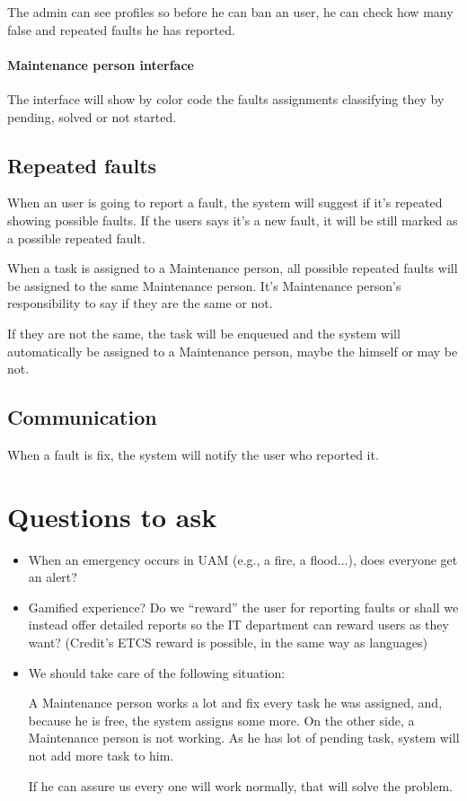 The admin can see profiles so before he can ban an user, he can check how many false and repeated faults he has reported.


\paragraph{Maintenance person interface}
The interface will show by color code the faults assignments classifying  they by pending, solved or not started.


\subsection{Repeated faults}
When an user is going to report a fault, the system will suggest if it's repeated showing possible faults. If the users says it's a new fault, it will be still marked as a possible repeated fault.

When a task is assigned to a Maintenance person, all possible repeated faults will be assigned to the same Maintenance person. It's Maintenance person's responsibility to say if they are the same or not.

If they are not the same, the task will be enqueued and the system will automatically be assigned to a Maintenance person, maybe the himself or may be not.


\subsection{Communication}

When a fault is fix, the system will notify the user who reported it.

\section{Questions to ask}

\begin{itemize}
\item When an emergency occurs in UAM (e.g., a fire, a flood...), does everyone get an alert?
\item Gamified experience? Do we ``reward'' the user for reporting faults or shall we instead offer detailed reports so the IT department can reward users as they want? (Credit's ETCS reward is possible, in the same way as languages)
\item We should take care of the following situation:

A Maintenance person works a lot and fix every task he was assigned, and, because he is free, the system assigns some more. On the other side, a Maintenance person is not working. As he has lot of pending task, system will not add more task to him. 

If he can assure us every one will work normally, that will solve the problem.
\end{itemize}

